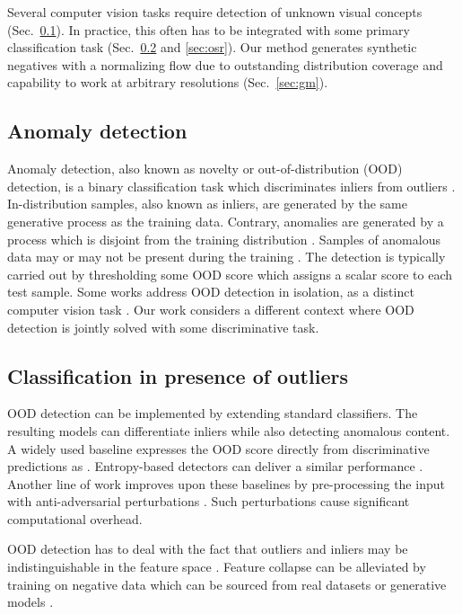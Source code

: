 \documentclass[lettersize,journal,hidelinks]{IEEEtran}
\begin{document}
Several computer vision tasks require detection of unknown visual concepts
(Sec.\ \ref{sec:ood}).
In practice, this often has to be integrated with some primary classification task (Sec.\ \ref{sec:oodd} and \ref{sec:osr}).
Our method generates synthetic negatives with a normalizing flow
due to outstanding distribution coverage and 
capability to work at arbitrary resolutions (Sec.\ \ref{sec:gm}).

\subsection{Anomaly detection}
\label{sec:ood}

Anomaly detection, also known as novelty or out-of-distribution (OOD) detection, is a binary classification task which discriminates inliers from outliers \cite{hawkins80book,ruff21pieee}.
In-distribution samples, also known as inliers, are generated by the same generative process as the training data.
Contrary, anomalies are generated by a process which is disjoint from the training distribution \cite{zhang21icml}.
Samples of anomalous data may or may not be present during the training \cite{liang18iclr,hendrycks19iclr}.
The detection is typically carried out by thresholding some OOD score  which assigns a scalar score to each test sample.
Some works address OOD detection in isolation, as a distinct computer vision task \cite{zhang21icml,zhou22tnnls,yang22tnnls,li14tpami,bergmann21ijcv,wang22tnnls,massoli22tnnls}.
Our work considers a different context where OOD detection is jointly solved with some discriminative task.

\subsection{Classification in presence of outliers}
\label{sec:oodd}

OOD detection \cite{hendrycks17iclr} can be implemented by extending  standard classifiers.
The resulting models can differentiate inliers while also detecting anomalous content.
A widely used baseline expresses the OOD score
directly from discriminative predictions as  \cite{hendrycks17iclr}.
Entropy-based detectors can deliver a similar performance \cite{macedo22tnnls,dhamija18nips}.
Another line of work improves upon these baselines 
by pre-processing the input with anti-adversarial perturbations \cite{liang18iclr}. 
Such perturbations cause significant 
computational overhead.

OOD detection has to deal with the fact that outliers and inliers may be indistinguishable in the feature space \cite{perera20cvpr}.
Feature collapse \cite{lucas19nips,amersfoort21arxiv} can be alleviated by training on negative data which can be sourced from real datasets \cite{hendrycks19iclr,dhamija18nips}
or generative models \cite{lee18iclr,grcic21visapp,du22iclr}.
\end{document}
